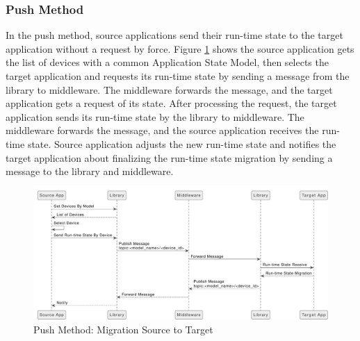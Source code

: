 \subsubsection{Push Method}
In the push method, source applications send their run-time state to the target application without a request by force. Figure \ref{fig:Migration-Source-to-Target-Push-Method} shows the source application gets the list of devices with a common Application State Model, then selects the target application and requests its run-time state by sending a message from the library to middleware. The middleware forwards the message, and the target application gets a request of its state. After processing the request, the target application sends its run-time state by the library to middleware. The middleware forwards the message, and the source application receives the run-time state. Source application adjusts the new run-time state and notifies the target application about finalizing the run-time state migration by sending a message to the library and middleware. 

\FloatBarrier \begin{figure}[H]
    \includegraphics[width=\linewidth]{../figures/Migration-Source-to-Target-Push-Method.pdf}
    \centering
    \caption{Push Method: Migration Source to Target}
    \label{fig:Migration-Source-to-Target-Push-Method}
\end{figure} \FloatBarrier

